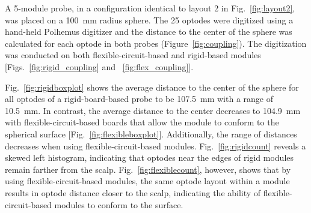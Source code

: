 A 5-module probe, in a configuration identical to layout 2 in Fig.~\ref{fig:layout2}, was placed on a 100~mm radius sphere. The 25 optodes were digitized using a hand-held Polhemus digitizer and the distance to the center of the sphere was calculated for each optode in both probes (Figure~\ref{fig:coupling}). The digitization was conducted on both flexible-circuit-based and rigid-based modules [Figs.~\ref{fig:rigid_coupling} and ~\ref{fig:flex_coupling}]. 

Fig.~\ref{fig:rigidboxplot} shows the average distance to the center of the sphere for all optodes of a rigid-board-based probe to be 107.5~mm with a range of 10.5~mm. In contrast, the average distance to the center decreases to 104.9~mm with flexible-circuit-based boards that allow the module to conform to the spherical surface [Fig.~\ref{fig:flexibleboxplot}]. Additionally, the range of distances decreases when using flexible-circuit-based modules. Fig.~\ref{fig:rigidcount} reveals a skewed left histogram, indicating that optodes near the edges of rigid modules remain farther from the scalp. Fig.~\ref{fig:flexiblecount}, however, shows that by using flexible-circuit-based modules, the same optode layout within a module results in optode distance closer to the scalp, indicating the ability of flexible-circuit-based modules to conform to the surface. 


